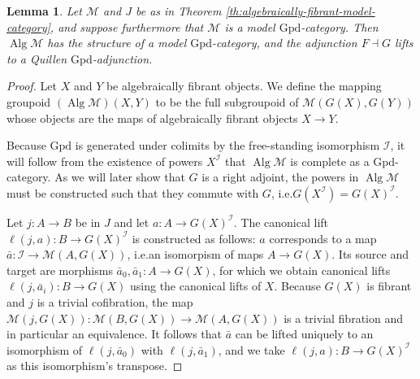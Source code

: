 \documentclass[a4paper]{article}
\newtheorem{lemma}[theorem]{Lemma}
\theoremstyle{remark}
\theoremstyle{definition}
\begin{document}
\begin{lemma}
  \label{lem:algebraically-fibrant-lproper-simplicial}
  Let $\mathcal{M}$ and $J$ be as in Theorem \ref{th:algebraically-fibrant-model-category}, and suppose furthermore that $\mathcal{M}$ is a model $\mathrm{Gpd}$-category.
  Then $\operatorname{Alg} \mathcal{M}$ has the structure of a model $\mathrm{Gpd}$-category, and the adjunction $F \dashv G$ lifts to a Quillen $\mathrm{Gpd}$-adjunction.
\end{lemma}
\begin{proof}
  Let $X$ and $Y$ be algebraically fibrant objects.
  We define the mapping groupoid $(\operatorname{Alg} \mathcal{M})(X, Y)$ to be the full subgroupoid of $\mathcal{M}(G(X), G(Y))$ whose objects are the maps of algebraically fibrant objects $X \rightarrow Y$.

  Because $\mathrm{Gpd}$ is generated under colimits by the free-standing isomorphism $\mathcal{I}$, it will follow from the existence of powers $X^\mathcal{I}$ that $\operatorname{Alg} \mathcal{M}$ is complete as a $\mathrm{Gpd}$-category.
  As we will later show that $G$ is a right adjoint, the powers in $\operatorname{Alg} \mathcal{M}$ must be constructed such that they commute with $G$, i.e.\@ $G(X^\mathcal{I}) = G(X)^\mathcal{I}$.

  Let $j : A \rightarrow B$ be in $J$ and let $a : A \rightarrow G(X)^\mathcal{I}$.
  The canonical lift $\ell(j, a) : B \rightarrow G(X)^\mathcal{I}$ is constructed as follows:
  $a$ corresponds to a map $\bar a : \mathcal{I} \rightarrow \mathcal{M}(A, G(X))$, i.e.\@ an isomorpism of maps $A \rightarrow G(X)$.
  Its source and target are morphisms $\bar a_0, \bar a_1 : A \rightarrow G(X)$, for which we obtain canonical lifts $\ell(j, \bar a_i) : B \rightarrow G(X)$ using the canonical lifts of $X$.
  Because $G(X)$ is fibrant and $j$ is a trivial cofibration, the map $\mathcal{M}(j, G(X)) : \mathcal{M}(B, G(X)) \rightarrow \mathcal{M}(A, G(X))$ is a trivial fibration and in particular an equivalence.
  It follows that $\bar a$ can be lifted uniquely to an isomorphism of $\ell(j, \bar a_0)$ with $\ell(j, \bar a_1)$, and we take $\ell(j, a) : B \rightarrow G(X)^\mathcal{I}$ as this isomorphism's transpose.


\end{proof}
\end{document}
